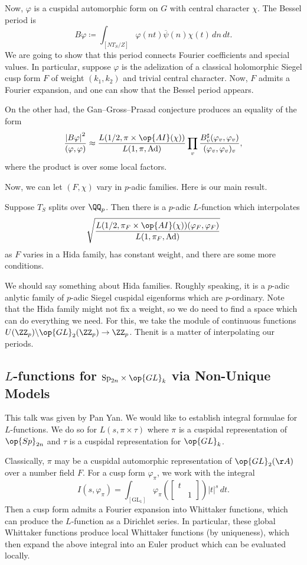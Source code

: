 \documentclass{article}
\begin{document}
Now, $\varphi$ is a cuspidal automorphic form on $G$ with central character $\chi$. The Bessel period is
\[B\varphi\coloneqq\int_{[NT_S/Z]}\varphi(nt)\overline\psi(n)\chi(t)\,dn\,dt.\]
We are going to show that this period connects Fourier coefficients and special values. In particular, suppose $\varphi$ is the adelization of a classical holomorphic Siegel cusp form $F$ of weight $(k_1,k_2)$ and trivial central character. Now, $F$ admits a Fourier expansion, and one can show that the Bessel period appears.

On the other had, the Gan--Gross--Prasad conjecture produces an equality of the form
\[\frac{\left|B\varphi\right|^2}{(\varphi,\varphi)}\approx\frac{L(1/2,\pi\times\op{AI}(\chi))}{L(1,\pi,\mathrm{Ad})}\prod_v\frac{B_v^\sharp(\varphi_v,\varphi_v)}{(\varphi_v,\varphi_v)_v},\]
where the product is over some local factors.

Now, we can let $(F,\chi)$ vary in $p$-adic families. Here is our main result.
\begin{theorem}
	Suppose $T_S$ splits over $\QQ_p$. Then there is a $p$-adic $L$-function which interpolates
	\[\sqrt{\frac{L(1/2,\pi_F\times\op{AI}(\chi))(\varphi_F,\varphi_F)}{L(1,\pi_F,\mathrm{Ad})}}\]
	as $F$ varies in a Hida family, has constant weight, and there are some more conditions.
\end{theorem}
We should say something about Hida families. Roughly speaking, it is a $p$-adic anlytic family of $p$-adic Siegel cuspidal eigenforms which are $p$-ordinary. Note that the Hida family might not fix a weight, so we do need to find a space which can do everything we need. For this, we take the module of continuous functions $U(\ZZ_p)\backslash\op{GL}_2(\ZZ_p)\to\ZZ_p$. Thenit is a matter of interpolating our periods.

\subsection{\texorpdfstring{$L$-}{ L-}functions for \texorpdfstring{$\mathrm{Sp}_{2n}\times\op{GL}_k$}{ Sp(2n) x GL(k)} via Non-Unique Models}
This talk was given by Pan Yan. We would like to establish integral formulae for $L$-functions. We do so for $L(s,\pi\times\tau)$ where $\pi$ is a cuspidal representation of $\op{Sp}_{2n}$ and $\tau$ is a cuspidal representation for $\op{GL}_k$.

Classically, $\pi$ may be a cuspidal automorphic representation of $\op{GL}_2(\AA)$ over a number field $F$. For a cusp form $\varphi_\pi$, we work with the integral
\[I(s,\varphi_\pi)=\int_{[\mathrm{GL}_1]}\varphi_\pi\left(\begin{bmatrix}
	t \\ & 1
\end{bmatrix}\right)\left|t\right|^s\,dt.\]
Then a cusp form admits a Fourier expansion into Whittaker functions, which can produce the $L$-function as a Dirichlet series. In particular, these global Whittaker functions produce local Whittaker functions (by uniqueness), which then expand the above integral into an Euler product which can be evaluated locally.
\end{document}
